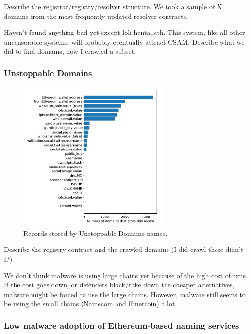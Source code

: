 \documentclass[10pt,sigconf,letterpaper]{acmart}
\begin{document}
Describe the registrar/registry/resolver structure. We took a sample of X domains from the most 
frequently updated resolver contracts.

Haven't found anything bad yet except loli-hentai.eth. This 
system, like all other uncensorable systems, will probably 
eventually attract CSAM. Describe what we did to find 
domains, how I crawled a subset.

\subsubsection{Unstoppable Domains}

\begin{figure}[t]
	\centering
	\includegraphics[width=3in]{figs/all_unstoppable_records.pdf}
	\caption{Records stored by Unstoppable Domains names.}
	\label{fig:unstoppable_records}
\end{figure}

Describe the registry contract and the crawled domains (I did 
crawl these didn't I?)

We don't think malware is using large chains yet because of 
the high cost of txns. If the cost goes down, or defenders 
block/take down the cheaper alternatives, malware might be 
forced to use the large chains. However, malware still seems 
to be using the small chains (Namecoin and Emercoin) a lot.

\subsubsection{Low malware adoption of Ethereum-based naming services}
\end{document}
